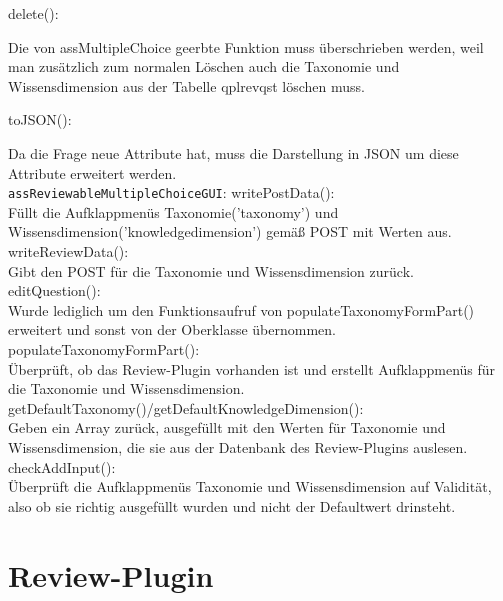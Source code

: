 \documentclass[a4paper]{scrreprt}
\begin{document}
delete():

Die von assMultipleChoice geerbte Funktion muss überschrieben werden, weil man zusätzlich zum normalen Löschen auch die Taxonomie und 
Wissensdimension aus der Tabelle qpl\textunderscore rev\textunderscore qst löschen muss.

toJSON():

Da die Frage neue Attribute hat, muss die Darstellung in JSON um diese Attribute erweitert werden.\\

\texttt{assReviewableMultipleChoiceGUI}:
writePostData():\\
Füllt die Aufklappmenüs Taxonomie('taxonomy') und Wissensdimension('knowledge\textunderscore dimension') gemäß POST mit Werten aus.\\

writeReviewData():\\
Gibt den POST für die Taxonomie und Wissensdimension zurück.\\

editQuestion():\\
Wurde lediglich um den Funktionsaufruf von populateTaxonomyFormPart() erweitert und sonst von der Oberklasse übernommen.\\

populateTaxonomyFormPart():\\
Überprüft, ob das Review-Plugin vorhanden ist und erstellt Aufklappmenüs für die Taxonomie und Wissensdimension.\\

getDefaultTaxonomy()/getDefaultKnowledgeDimension():\\
Geben ein Array zurück, ausgefüllt mit den Werten für Taxonomie und Wissensdimension, die sie aus der Datenbank des Review-Plugins auslesen.\\

checkAddInput():\\
Überprüft die Aufklappmenüs Taxonomie und Wissensdimension auf Validität, also ob sie richtig ausgefüllt wurden und nicht der Defaultwert drinsteht.



\section{Review-Plugin}
\end{document}

